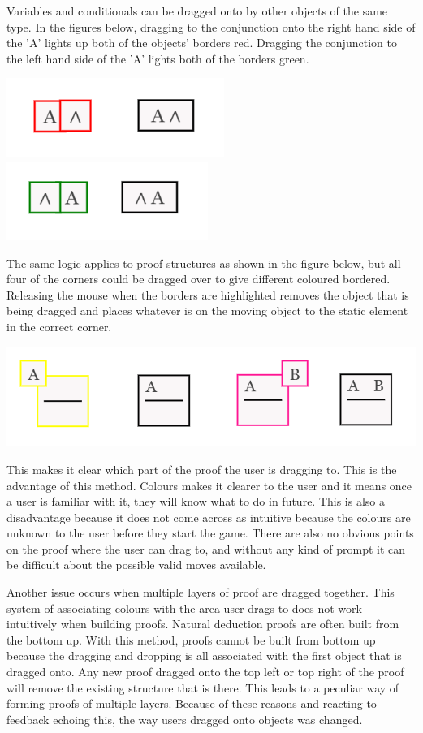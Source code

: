 Variables and conditionals can be dragged onto by other objects of the same type. In the figures below, dragging to the conjunction onto the right hand side of the 'A' lights up both of the objects' borders red. Dragging the conjunction to the left hand side of the 'A' lights both of the borders green.
 
\includegraphics[scale=0.75]{AConjunction}
\includegraphics[scale=0.75]{ConjunctionA}

The same logic applies to proof structures as shown in the figure below, but all four of the corners could be dragged over to give different coloured bordered. Releasing the mouse when the borders are highlighted removes the object that is being dragged and places whatever is on the moving object to the static element in the correct corner.  

\centerline{\includegraphics[scale=0.7]{oldColour}}

This makes it clear which part of the proof the user is dragging to. This is the advantage of this method. Colours makes it clearer to the user and it means once a user is familiar with it, they will know what to do in future. This is also a disadvantage because it does not come across as intuitive because the colours are unknown to the user before they start the game. There are also no obvious points on the proof where the user can drag to, and without any kind of prompt it can be difficult about the possible valid moves available.

Another issue occurs when multiple layers of proof are dragged together. This system of associating colours with the area user drags to does not work intuitively when building proofs. Natural deduction proofs are often built from the bottom up. With this method, proofs cannot be built from bottom up because the dragging and dropping is all associated with the first object that is dragged onto. Any new proof dragged onto the top left or top right of the proof will remove the existing structure that is there. This leads to a peculiar way of forming proofs of multiple layers. Because of these reasons and reacting to feedback echoing this, the way users dragged onto objects was changed.  


